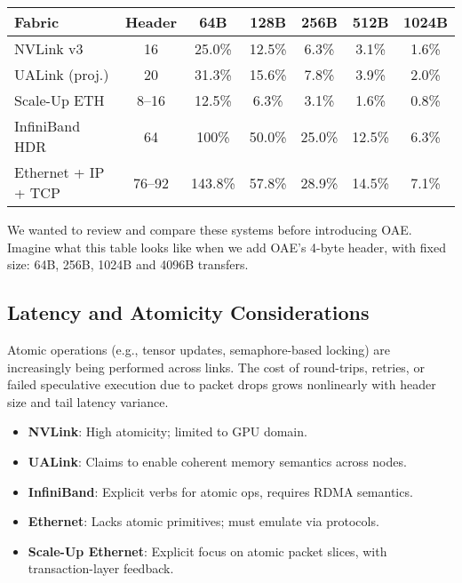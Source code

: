 \documentclass[../../../OAE-SPEC-MAIN.tex]{subfiles}
\begin{document}
\begin{table}[h]
\centering
\begin{tabular}{@{}lcccccc@{}}
\toprule
\textbf{Fabric} & \textbf{Header} & \textbf{64B} & \textbf{128B} & \textbf{256B} & \textbf{512B} & \textbf{1024B} \\
\midrule
NVLink v3       & 16     & 25.0\% & 12.5\% & 6.3\% & 3.1\% & 1.6\% \\
UALink (proj.)  & 20     & 31.3\% & 15.6\% & 7.8\% & 3.9\% & 2.0\% \\
Scale-Up ETH    & 8–16   & 12.5\% & 6.3\% & 3.1\% & 1.6\% & 0.8\% \\
InfiniBand HDR  & 64     & 100\%  & 50.0\% & 25.0\% & 12.5\% & 6.3\% \\
Ethernet + IP + TCP & 76–92  & 143.8\% & 57.8\% & 28.9\% & 14.5\% & 7.1\% \\
\bottomrule
\end{tabular}
\label{tab:header-overhead}
\end{table}

\begin{highlightbox}
We wanted to  review and compare  these systems  before introducing OAE. Imagine what this table looks like when we add OAE's 4-byte header,  with fixed size: 64B, 256B, 1024B and 4096B  transfers.%
\end{highlightbox}


\subsection{Latency and Atomicity Considerations}

Atomic operations (e.g., tensor updates, semaphore-based locking) are increasingly being performed across links. The cost of round-trips, retries, or failed speculative execution due to packet drops grows nonlinearly with header size and tail latency variance.

\begin{itemize}
  \item \textbf{NVLink}: High atomicity; limited to GPU domain.
  \item \textbf{UALink}: Claims to enable coherent memory semantics across nodes.
  \item \textbf{InfiniBand}: Explicit verbs for atomic ops, requires RDMA semantics.
  \item \textbf{Ethernet}: Lacks atomic primitives; must emulate via protocols.
  \item \textbf{Scale-Up Ethernet}: Explicit focus on atomic packet slices, with transaction-layer feedback.
\end{itemize}
\end{document}
